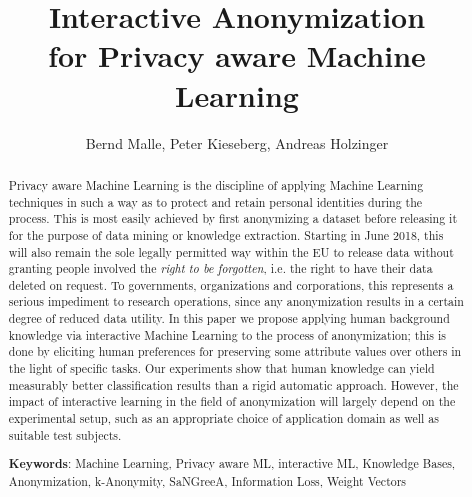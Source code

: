 \documentclass{llncs}
\begin{document}
\title{Interactive Anonymization\\
for Privacy aware Machine Learning}

\author{Bernd Malle, Peter Kieseberg, Andreas Holzinger}

	
\maketitle

\begin{abstract}

Privacy aware Machine Learning is the discipline of applying Machine Learning techniques in such a way as to protect and retain personal identities during the process. This is most easily achieved by first anonymizing a dataset before releasing it for the purpose of data mining or knowledge extraction. Starting in June 2018, this will also remain the sole legally permitted way within the EU to release data without granting people involved the \textit{right to be forgotten}, i.e. the right to have their data deleted on request. To governments, organizations and corporations, this represents a serious impediment to research operations, since any anonymization results in a certain degree of reduced data utility. In this paper we propose applying human background knowledge via interactive Machine Learning to the process of anonymization; this is done by eliciting human preferences for preserving some attribute values over others in the light of specific tasks. Our experiments show that human knowledge can yield measurably better classification results than a rigid automatic approach. However, the impact of interactive learning in the field of anonymization will largely depend on the experimental setup, such as an appropriate choice of application domain as well as suitable test subjects.


\medskip

\textbf{Keywords}: Machine Learning, Privacy aware ML, interactive ML, Knowledge Bases, Anonymization, k-Anonymity, SaNGreeA, Information Loss, Weight Vectors


\end{abstract}
\end{document}
